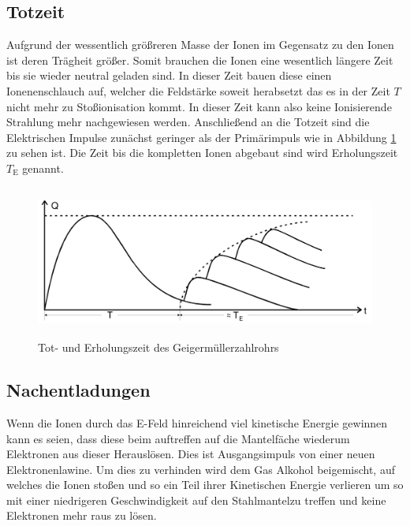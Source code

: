 \subsection{Totzeit}
Aufgrund der wessentlich größreren Masse der Ionen im Gegensatz zu den Ionen ist deren Trägheit größer. Somit brauchen die Ionen eine wesentlich längere Zeit bis sie wieder neutral geladen sind. In dieser Zeit bauen diese einen Ionenenschlauch auf, welcher die Feldstärke soweit herabsetzt das es in der Zeit $T$ nicht mehr zu Stoßionisation kommt. In dieser Zeit kann also keine Ionisierende Strahlung mehr nachgewiesen werden. Anschließend an die Totzeit sind die Elektrischen Impulse zunächst geringer als der Primärimpuls wie in Abbildung \ref{fig:tot} zu sehen ist. Die Zeit bis die kompletten Ionen abgebaut sind wird Erholungszeit $T_\text{E}$ genannt.
\begin{figure}
  \centering
  \includegraphics[height=5cm]{picture/Nachentladung.pdf}
  \caption{Tot- und Erholungszeit des Geigermüllerzahlrohrs \cite{sample}}
  \label{fig:tot}
\end{figure}


\subsection{Nachentladungen}
Wenn die Ionen durch das E-Feld hinreichend viel kinetische Energie gewinnen kann es seien, dass diese beim auftreffen auf die Mantelfäche wiederum Elektronen aus dieser Herauslösen. Dies ist Ausgangsimpuls von einer neuen Elektronenlawine. Um dies zu verhinden wird dem Gas Alkohol beigemischt, auf welches die Ionen stoßen und so ein Teil ihrer Kinetischen Energie verlieren um so mit einer niedrigeren Geschwindigkeit auf den Stahlmantelzu treffen und keine Elektronen mehr raus zu lösen.


